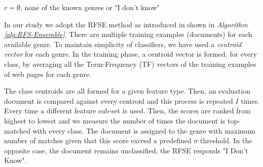 \hfill \break

\begin{algorithm}[H]
\caption{The \textit{RFSE} algorithm.}\label{alg:RFS-Ensemble}

{
      $r = \emptyset$, none of the known genres or "I don't know"\;
}
\end{algorithm}

\hfill \break

In our study we adopt the RFSE method as introduced in  shown in \textit{Algorithm \ref{alg:RFS-Ensemble}}. There are multiple training examples (documents) for each available genre. To maintain simplicity of classifiers, we have used a \textit{centroid vector} for each genre. In the training phase, a centroid vector is formed, for every class, by averaging all the Term-Frequency (TF) vectors of the training examples of web pages for each genre.

The class centroids are all formed for a given feature type. Then, an evaluation document is compared against every centroid and this process is repeated $I$ times. Every time a different feature sub-set is used. Then, the scores are ranked from highest to lowest and we measure the number of times the document is top-matched with every class. The document is assigned to the genre with maximum number of matches given that this score exceed a predefined $\sigma$ threshold. In the opposite case, the document remains unclassified, the RFSE responds "I Don't Know".


